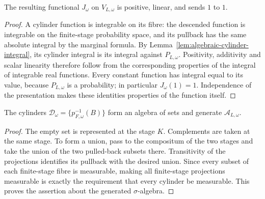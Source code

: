 \begin{lemma}\label{lem:cylinder-functional}
\leanok
{}
The resulting functional $J_\omega$ on $V_{L,\omega}$ is positive,
linear, and sends $1$ to $1$.
\end{lemma}
\begin{proof}
A cylinder function is integrable on its fibre: the descended function
is integrable on the finite-stage probability space, and its pullback
has the same absolute integral by the marginal formula. By
Lemma~\ref{lem:algebraic-cylinder-integral}, its cylinder integral is
its integral against $P_{L,\omega}$. Positivity, additivity and scalar
linearity therefore follow from the corresponding properties of the
integral of integrable real functions. Every constant function has
integral equal to its value, because $P_{L,\omega}$ is a probability;
in particular $J_\omega(1)=1$. Independence of the presentation makes
these identities properties of the function itself.
\end{proof}

\begin{lemma}\label{lem:fibre-cylinder-set-algebra}
\leanok
{}
The cylinders $\mathcal D_\omega=\{p_{F,\omega}^{-1}(B)\}$ form an
algebra of sets and generate $\mathcal A_{L,\omega}$.
\end{lemma}
\begin{proof}
The empty set is represented at the stage $K$. Complements are taken
at the same stage. To form a union, pass to the compositum of the two
stages and take the union of the two pulled-back subsets there.
Transitivity of the projections identifies its pullback with the
desired union. Since every subset of each finite-stage fibre is
measurable, making all finite-stage projections measurable is exactly
the requirement that every cylinder be measurable. This proves the
assertion about the generated $\sigma$-algebra.
\end{proof}

